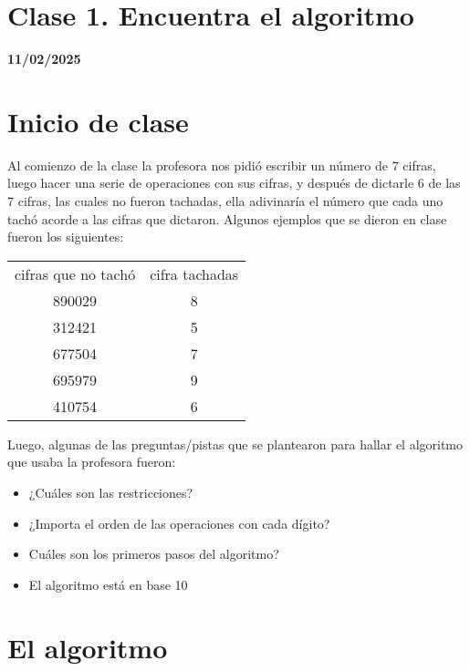 \section{Clase 1. Encuentra el algoritmo}
\textbf{11/02/2025}
\section{Inicio de clase}

Al comienzo de la clase la profesora nos pidió escribir un número de 7 cifras, luego hacer una serie de operaciones con sus cifras, y después de dictarle 6 de las 7 cifras, las cuales no fueron tachadas, ella adivinaría el número que cada uno tachó acorde a las cifras que dictaron. Algunos ejemplos que se dieron en clase fueron los siguientes:
    \\
    \begin{center}
        \begin{tabular}{c|c}
            cifras que no tachó & cifra tachadas\\
            890029 & 8\\
            312421 & 5\\
            677504 & 7\\
            695979 & 9\\
            410754 & 6\\
        \end{tabular}
    \end{center}
    
Luego, algunas de las preguntas/pistas que se plantearon para hallar el algoritmo que usaba la profesora fueron:\\

    \begin{itemize}
        \item ¿Cuáles son las restricciones?
        \item ¿Importa el orden de las operaciones con cada dígito?
        \item Cuáles son los primeros pasos del algoritmo?
        \item El algoritmo está en base 10
    \end{itemize}

\section{El algoritmo}
